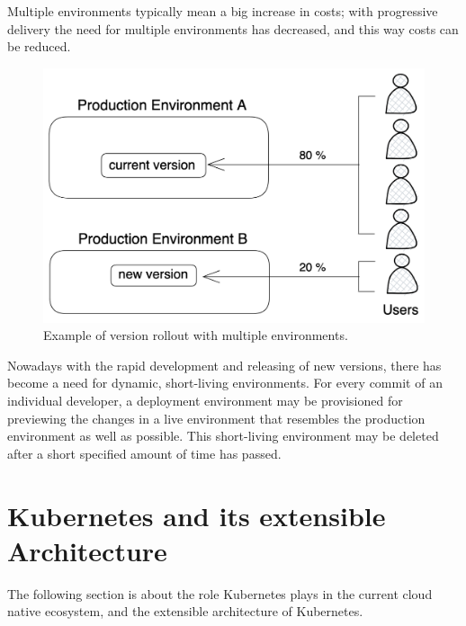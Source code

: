 Multiple environments typically mean a big increase in costs;
with progressive delivery the need for multiple environments has decreased,
and this way costs can be reduced.

\begin{figure}[h]
	\centering
	\includegraphics[width=0.75\linewidth]{assets/deploy-multiple-envs.png}
	\caption{Example of version rollout with multiple environments.
	}
	\label{fig:deploy-multiple-envs}	
\end{figure}

Nowadays with the rapid development and releasing of new versions,
there has become a need for dynamic, short-living environments.
For every commit of an individual developer,
a deployment environment may be provisioned for previewing the changes
in a live environment that resembles the production environment as well as possible.
This short-living environment may be deleted after a short specified amount of time
has passed.






\section{Kubernetes and its extensible Architecture}
\label{theoretical-background:kubernetes}

The following section is about
the role Kubernetes plays in the current cloud native ecosystem,
and the extensible architecture of Kubernetes.


